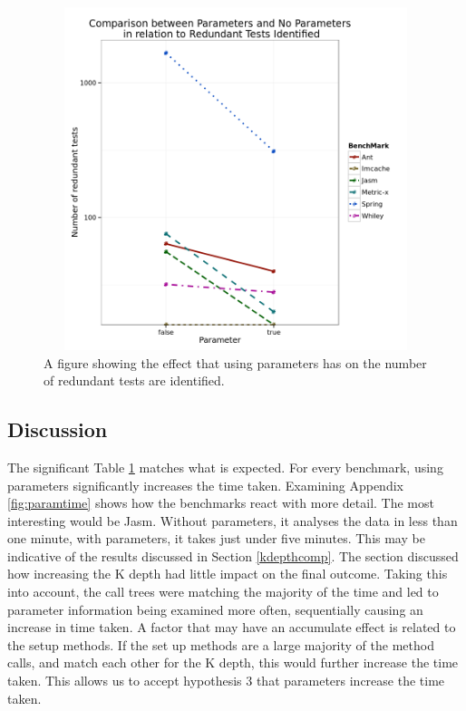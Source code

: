 \documentclass[11pt
              , a4paper
              , twoside
              , openright
              ]{report}
\begin{document}
\begin{figure}[h]
\begin{center}
\includegraphics[height=10cm, width = 14.5cm]{Parameters.png}
\end{center}
\caption{A figure showing the effect that using parameters has on the number of redundant tests are identified.}
\label{fig:paramgraph}
\end{figure}


\subsection{Discussion}
The significant Table \ref{fig:paramgraph} matches what is expected. For every benchmark, using parameters significantly increases the time taken. Examining Appendix \ref{fig:paramtime} shows how the benchmarks react with more detail. The most interesting would be Jasm. Without parameters, it analyses the data in less than one minute, with parameters, it takes just under five minutes. This may be indicative of the results discussed in Section \ref{kdepthcomp}. The section discussed how increasing the K depth had little impact on the final outcome. Taking this into account, the call trees were matching the majority of the time and led to parameter information being examined more often, sequentially causing an increase in time taken. A factor that may have an accumulate effect is related to the setup methods. If the set up methods are a large majority of the method calls, and match each other for the K depth, this would further increase the time taken. This allows us to accept hypothesis 3 that parameters increase the time taken.
\end{document}
